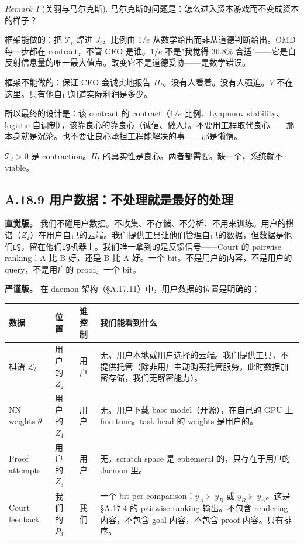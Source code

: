 \documentclass[11pt,a4paper]{article}
\theoremstyle{definition}
\theoremstyle{remark}
\newtheorem{remark}[theorem]{Remark}
\begin{document}
\begin{remark}[关羽与马尔克斯]
马尔克斯的问题是：怎么进入资本游戏而不变成资本的样子？

框架能做的：把 $\mathcal{T}_t$ 焊进 $J_t$，比例由 $1/e$ 从数学给出而非从道德判断给出。OMD 每一步都在 contract，不管 CEO 是谁。$1/e$ 不是"我觉得 36.8\% 合适"——它是自反射信息量的唯一最大值点。改变它不是道德妥协——是数学错误。

框架不能做的：保证 CEO 会诚实地报告 $\Pi_t$。没有人看着。没有人强迫。$V$ 不在这里。只有他自己知道实际利润是多少。

所以最终的设计是：该 contract 的 contract（$1/e$ 比例、Lyapunov stability、logistic 自调制），该靠良心的靠良心（诚信、做人）。不要用工程取代良心——那本身就是沉沦。也不要让良心承担工程能解决的事——那是懒惰。

$\mathcal{T}_t > 0$ 是 contraction。$\Pi_t$ 的真实性是良心。两者都需要。缺一个，系统就不 viable。
\end{remark}


\subsection{A.18.9 用户数据：不处理就是最好的处理}

\textbf{直觉版。}
我们不碰用户数据。不收集、不存储、不分析、不用来训练。用户的棋谱（$Z_2$）在用户自己的云端。我们提供工具让他们管理自己的数据，但数据是他们的，留在他们的机器上。我们唯一拿到的是反馈信号——Court 的 pairwise ranking：A 比 B 好，还是 B 比 A 好。一个 bit。不是用户的内容，不是用户的 query，不是用户的 proof。一个 bit。

\textbf{严谨版。}
在 daemon 架构（\S A.17.11）中，用户数据的位置是明确的：

\begin{center}
\small
\begin{tabularx}{\textwidth}{l l l X}
\toprule
\textbf{数据} & \textbf{位置} & \textbf{谁控制} & \textbf{我们能看到什么} \\
\midrule
棋谱 $\mathcal{L}_t$ & 用户的 $Z_2$ & 用户 & 无。用户本地或用户选择的云端。我们提供工具，不提供托管（除非用户主动购买托管服务，此时数据加密存储，我们无解密能力）。 \\
NN weights $\theta$ & 用户的 $Z_4$ & 用户 & 无。用户下载 base model（开源），在自己的 GPU 上 fine-tune。task head 的 weights 是用户的。 \\
Proof attempts & 用户的 $Z_3$ & 用户 & 无。scratch space 是 ephemeral 的，只存在于用户的 daemon 里。 \\
Court feedback & 我们的 $P_3$ & 我们 & 一个 bit per comparison：$y_A \succ y_B$ 或 $y_B \succ y_A$。这是 \S A.17.4 的 pairwise ranking 输出。不包含 rendering 内容，不包含 goal 内容，不包含 proof 内容。只有排序。 \\
\bottomrule
\end{tabularx}
\end{center}
\end{document}
